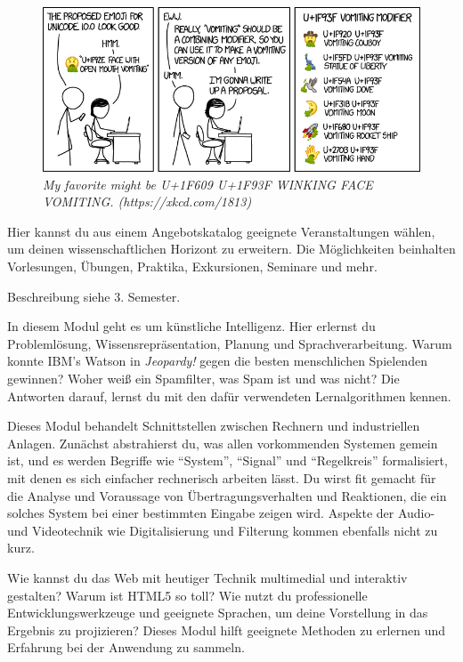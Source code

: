 \begin{figure}[b!]
\centering
\includegraphics[scale=.4]{img/xkcd/vomiting_emoji.png}
\caption*{{\small \textit{My favorite might be U+1F609 U+1F93F WINKING FACE VOMITING\@. (https://xkcd.com/1813)}}}
\end{figure}


Hier kannst du aus einem Angebotskatalog geeignete Veranstaltungen wählen, um deinen wissenschaftlichen Horizont zu erweitern.
Die Möglichkeiten beinhalten Vorlesungen, Übungen, Praktika, Exkursionen, Seminare und mehr.

Beschreibung siehe 3. Semester.

In diesem Modul geht es um künstliche Intelligenz.
Hier erlernst du Problemlösung, Wissensrepräsentation, Planung und Sprachverarbeitung.
Warum konnte IBM's Watson in \textit{Jeopardy!} gegen die besten menschlichen Spielenden gewinnen?
Woher weiß ein Spamfilter, was Spam ist und was nicht?
Die Antworten darauf, lernst du mit den dafür verwendeten Lernalgorithmen kennen.

Dieses Modul behandelt Schnittstellen zwischen Rechnern und industriellen Anlagen.
Zunächst abstrahierst du, was allen vorkommenden Systemen gemein ist, und es werden Begriffe wie \enquote{System}, \enquote{Signal} und \enquote{Regelkreis} formalisiert, mit denen es sich einfacher rechnerisch arbeiten lässt.
Du wirst fit gemacht für die Analyse und Voraussage von Übertragungsverhalten und Reaktionen, die ein solches System bei einer bestimmten Eingabe zeigen wird.
Aspekte der Audio- und Videotechnik wie Digitalisierung und Filterung kommen ebenfalls nicht zu kurz.

Wie kannst du das Web mit heutiger Technik multimedial und interaktiv gestalten? Warum ist HTML5 so toll?
Wie nutzt du professionelle Entwicklungswerkzeuge und geeignete Sprachen, um deine Vorstellung in das Ergebnis zu projizieren?
Dieses Modul hilft geeignete Methoden zu erlernen und Erfahrung bei der Anwendung zu sammeln.

